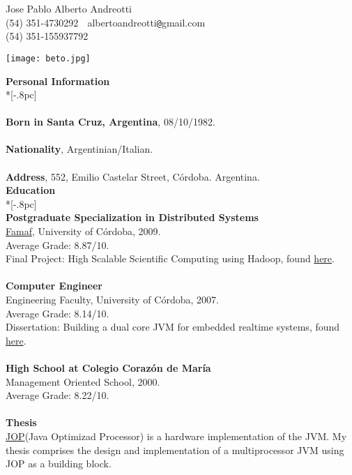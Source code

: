 \documentclass[a4paper,11pt,english]{article}
\begin{document}
\begin{multicols}{2}
\begin{center}
\hspace{155mm}

{\Large Jose Pablo Alberto Andreotti} \\
(54) 351-4730292 $\;$ albertoandreotti\verb|@|gmail.com $\;$ \\(54) 351-155937792 \\[3pc]
\columnbreak
\end{center}
\texttt{[image: beto.jpg]}
\end{multicols}

{\large \bf Personal Information} \\*[-.8pc]
\underline{\hspace{6in}} \\
\\
{\bf Born in Santa Cruz, Argentina}, 08/10/1982.\\
\\
{\bf Nationality}, Argentinian/Italian.\\
\\
{\bf Address}, 552, Emilio Castelar Street, C\'ordoba. Argentina.\\

{\large \bf Education} \\*[-.8pc]
\underline{\hspace{6in}} \\
\newline
{\bf Postgraduate Specialization in Distributed Systems}\\
\href{http://www.famaf.unc.edu.ar/}{Famaf}, University of C\'ordoba, 2009. \\
Average Grade: 8.87/10. \\
Final Project: High Scalable Scientific Computing using Hadoop, found \href{https://docs.google.com/viewer?a=v&pid=explorer&chrome=true&srcid=0B5AOpwg8IzVANjJlODZhZDctNWUzMS00MmNhLWI3OWMtMWNhMTdjODQwNjVl&hl=en}{here}.\\
\\
{\bf Computer Engineer}\\
Engineering Faculty, University of C\'ordoba, 2007.\\
Average Grade: 8.14/10. \\
Dissertation: Building a dual core JVM for embedded realtime systems, found \href{https://docs.google.com/viewer?a=v&pid=explorer&chrome=true&srcid=1gdJXYgQtLDHDOxGDtbKzdmAl1LmNx-yo4w6vNl-K_Z-1YocLhtJxMvoqGvd1&hl=en}{here}.\\
\\
{\bf High School at Colegio Coraz\'on de Mar\'ia}\\
Management Oriented School, 2000.\\
Average Grade: 8.22/10.\\
\\
{\bf Thesis} \\
\href{http://www.jopdesign.com}{JOP}(Java Optimizad Processor) is a hardware implementation of the JVM. My thesis 
comprises the design and implementation of a multiprocessor JVM using JOP as a building block.\\
\end{document}
